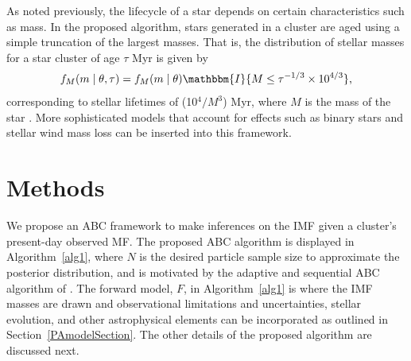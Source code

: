 \documentclass[ejs]{imsart}
\numberwithin{equation}{section}
\theoremstyle{plain}
\newcommand{\indic}{\mathbbm{I}}
\begin{document}
As noted previously, the lifecycle of a star depends on certain characteristics such as mass.  In the proposed algorithm, stars generated in a cluster are aged using a simple truncation of the largest masses.  
That is, the distribution of stellar masses for a star cluster of age $\tau$ Myr is given by
	\begin{align}
	f_M(m \mid \theta, \tau) = f_M(m \mid \theta) \indic \{M \leq \tau^{-1/3} \times 10^{4/3}\} \text{,}
	\label{eq:age}
	\end{align}
corresponding to stellar lifetimes of (10$^4/M^{3}$) Myr, where $M$ is the mass of the star \citep{hansen2004, Chaisson:2011}. 
More sophisticated models that account for effects such as binary stars and stellar wind mass loss can be inserted into this framework.  



\section{Methods}
\label{methodSec}

We propose an ABC framework to make inferences on the IMF given a cluster's present-day observed MF.  The proposed ABC algorithm is displayed in Algorithm~\eqref{alg1}, where $N$ is the desired particle sample size to approximate the posterior distribution, and is motivated by the adaptive and sequential ABC algorithm of \cite{beaumont2009}.  
The forward model, $F$, in Algorithm~\eqref{alg1} is where the IMF masses are drawn and observational limitations and uncertainties, stellar evolution, and other astrophysical elements can be incorporated as outlined in Section~\ref{PAmodelSection}.  The other details of the proposed algorithm are discussed next.
\end{document}
